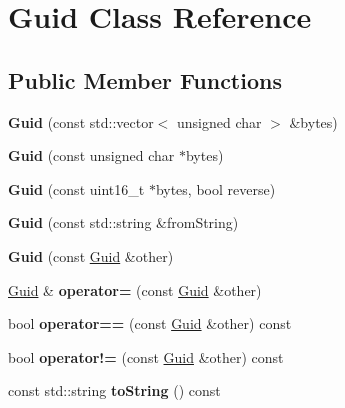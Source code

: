 \hypertarget{classGuid}{}\section{Guid Class Reference}
\label{classGuid}
\subsection*{Public Member Functions}
\begin{DoxyCompactItemize}
\item 
\mbox{\label{classGuid_a9a5e490fa2d8a53613a773105306a433}} 
{\bfseries Guid} (const std\+::vector$<$ unsigned char $>$ \&bytes)
\item 
\mbox{\label{classGuid_a81dac7d2c53fafb319768ba3de5bfcd8}} 
{\bfseries Guid} (const unsigned char $\ast$bytes)
\item 
\mbox{\label{classGuid_a1ab7cdf6a0419dffec8dd84ecdb4f953}} 
{\bfseries Guid} (const uint16\+\_\+t $\ast$bytes, bool reverse)
\item 
\mbox{\label{classGuid_a2ff15b4228651b71b205a99ccb4517cf}} 
{\bfseries Guid} (const std\+::string \&from\+String)
\item 
\mbox{\label{classGuid_ac01ef21cabae1ffe62a624c7ee60d082}} 
{\bfseries Guid} (const \hyperlink{classGuid}{Guid} \&other)
\item 
\mbox{\label{classGuid_a37dfa1f97ac2d20e084d7a81182c1b61}} 
\hyperlink{classGuid}{Guid} \& {\bfseries operator=} (const \hyperlink{classGuid}{Guid} \&other)
\item 
\mbox{\label{classGuid_ada4436956a9ec8990e4c948e03988e04}} 
bool {\bfseries operator==} (const \hyperlink{classGuid}{Guid} \&other) const
\item 
\mbox{\label{classGuid_a93ec392896ee2f80b1229c3db6ee40f7}} 
bool {\bfseries operator!=} (const \hyperlink{classGuid}{Guid} \&other) const
\item 
\mbox{\label{classGuid_a3a107da5f94f8b90b7d23d3249dc83c9}} 
const std\+::string {\bfseries to\+String} () const
\item 

\end{DoxyCompactItemize}
